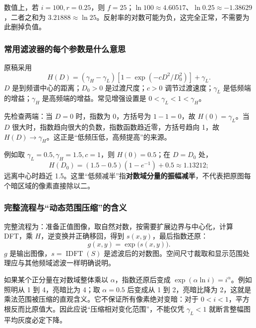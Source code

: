 数值上，若 $i=100,r=0.25$，则 $f=25$；$\ln100\approx4.60517$、$\ln0.25\approx-1.38629$，二者之和为 $3.21888\approx\ln25$。反射率的对数可能为负，这完全正常，不需要为此删掉负值。

\subsubsection{常用滤波器的每个参数是什么意思}
原稿采用
\[
H(D)=(\gamma_H-\gamma_L)
\left[1-\exp\!\left(-cD^2/D_0^2\right)\right]+\gamma_L.
\]
$D$ 是到频谱中心的距离；$D_0>0$ 是过渡尺度；$c>0$ 调节过渡速度；$\gamma_L$ 是低频端的增益；$\gamma_H$ 是高频端的增益。常见增强设置是 $0<\gamma_L<1<\gamma_H$。

先检查两端：当 $D=0$ 时，指数为 0，方括号为 $1-1=0$，故 $H(0)=\gamma_L$。当 $D$ 很大时，指数趋向很大的负数，指数函数趋近零，方括号趋向 1，故 $H(D)\to\gamma_H$。这正是“低频压低，高频提高”的来源。

例如取 $\gamma_L=0.5,\gamma_H=1.5,c=1$，则 $H(0)=0.5$；在 $D=D_0$ 处，
\[
H(D_0)=(1.5-0.5)(1-e^{-1})+0.5
\approx1.13212;
\]
远离中心时趋近 1.5。这里“低频减半”指\textbf{对数域分量的振幅减半}，不代表把原图每个暗区域的像素直接除以二。

\begin{center}
\end{center}

\subsubsection{完整流程与“动态范围压缩”的含义}
完整流程为：准备正值图像，取自然对数，按需要扩展边界与中心化，计算 DFT，乘 $H$，逆变换并正确移回，得到 $s(x,y)$，最后指数还原：
\[
g(x,y)=\exp\bigl(s(x,y)\bigr).
\]
$g$ 是输出图像，$s=\operatorname{IDFT}(S)$ 是滤波后的对数图。空间尺寸裁取和显示范围处理应与其他频域滤波一样明确说明。

如果某个正分量在对数域整体乘以 $\alpha$，指数还原后变成 $\exp(\alpha\ln i)=i^\alpha$。例如照明从 1 到 4，亮暗比为 4；取 $\alpha=0.5$ 后变成从 1 到 2，亮暗比降为 2，这就是乘法范围被压缩的直观含义。它不保证所有像素绝对变暗：对于 $0<i<1$，平方根反而比原值大。因此应说“压缩相对变化范围”，不能仅凭 $\gamma_L<1$ 就断言整幅图平均灰度必定下降。

